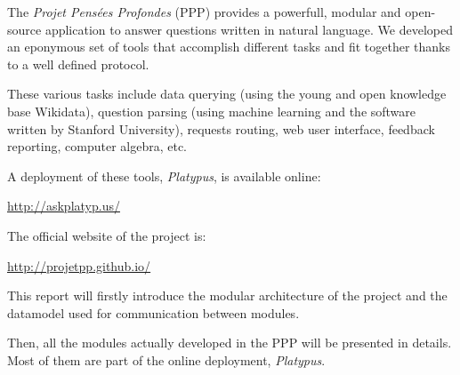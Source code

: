 The \emph{Projet Pensées Profondes} (PPP) provides a powerfull,
modular and open-source application to answer questions written in natural language.
We developed an eponymous set of tools that accomplish different tasks and fit
together thanks to a well defined protocol.

These various tasks include data querying (using the young and open
knowledge base Wikidata), question parsing (using machine learning and the
\CoreNLP software written by Stanford University),
requests routing, web user interface, feedback reporting, computer algebra, etc.

A deployment of these tools, \emph{Platypus}, is available online:

\begin{center}
    \url{http://askplatyp.us/}
\end{center}

The official website of the project is:

\begin{center}
    \url{http://projetpp.github.io/}
\end{center}

\medbreak

This report will firstly introduce the modular architecture of the
project and the datamodel used for communication between modules.

Then, all the modules actually developed in the PPP will be presented in details. Most of
them are part of the online deployment, \emph{Platypus}.
